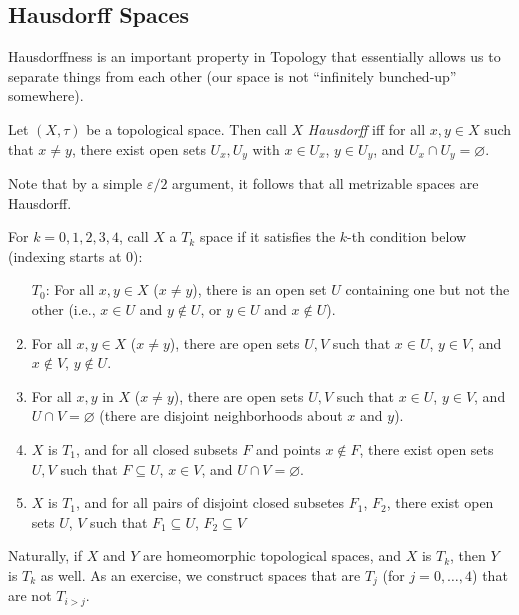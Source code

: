 \documentclass{fkbook}
\begin{document}
\begin{adjustwidth}{1em}{1em}
  \section{Hausdorff Spaces}
  Hausdorffness is an important property in Topology that essentially
  allows us to separate things from each other (our space is not
  ``infinitely bunched-up'' somewhere).
  \begin{definition}
    Let $(X, \tau)$ be a topological space. Then call $X$
    \emph{Hausdorff} iff for all $x, y \in X$ such that $x \neq y$,
    there exist open sets $U_x, U_y$ with $x \in U_x$, $y \in U_y$,
    and $U_x \cap U_y = \varnothing$.
  \end{definition}
  Note that by a simple $\varepsilon/2$ argument, it follows that all
  metrizable spaces are Hausdorff.
  \begin{definition}[$T_k$ spaces]
    For $k = 0, 1, 2, 3, 4$, call $X$ a $T_k$ space if it satisfies
    the $k$-th condition below (indexing starts at 0):
    \begin{enumerate}[label=$T_\arabic*$:]
      \item[$T_0$:] For all $x,y \in X$ ($x \neq y$), there is an open
        set $U$ containing one but not the other (i.e., $x \in U$ and
        $y \not \in U$, or $y \in U$ and $x \not \in U$).
      \item For all $x,y \in X$ ($x \neq y$), there are open sets
        $U,V$ such that $x \in U$, $y \in V$, and $x \not \in V$, $y
        \not\in U$.
      \item For all $x,y$ in $X$ ($x \neq y$), there are open sets $U,
        V$ such that $x \in U$, $y \in V$, and $U \cap V =
        \varnothing$ (there are disjoint neighborhoods about $x$ and
        $y$).
      \item $X$ is $T_1$, and for all closed subsets $F$ and points $x
        \not \in F$, there exist open sets $U,V$ such that $F
        \subseteq U$, $x \in V$, and $U \cap V = \varnothing$.
      \item $X$ is $T_1$, and for all pairs of disjoint closed
        subsetes $F_1$, $F_2$, there exist open sets $U$, $V$ such
        that $F_1 \subseteq U$, $F_2 \subseteq V$
    \end{enumerate}
  \end{definition}
  Naturally, if $X$ and $Y$ are homeomorphic topological spaces, and
  $X$ is $T_k$, then $Y$ is $T_k$ as well. As an exercise, we
  construct spaces that are $T_j$ (for $j = 0, \ldots, 4$) that are
  not $T_{i > j}$.
  \begin{enumerate}[label=($X_\arabic*)$:]

\end{enumerate}
\end{adjustwidth}
\end{document}
